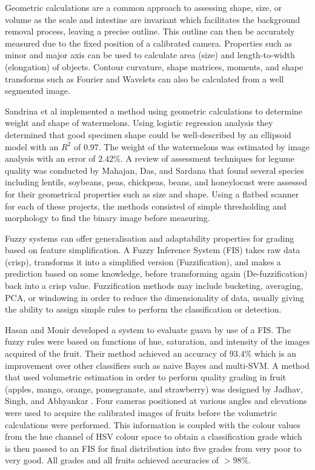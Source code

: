 \documentclass[fleqn,twoside,12pt]{report}
\begin{document}
Geometric calculations are a common approach to assessing shape, size, or volume as the scale and intestine are invariant which facilitates the background removal process, leaving a precise outline. This outline can then be accurately measured due to the fixed position of a calibrated camera. Properties such as minor and major axis can be used to calculate area (size) and length-to-width (elongation) of objects. Contour curvature, shape matrices, moments, and shape transforms such as Fourier and Wavelets can also be calculated from a well segmented image. 

Sandrina et al \cite{sandrina} implemented a method using geometric calculations to determine weight and shape of watermelons. Using logistic regression analysis they determined that good specimen shape could be well-described by an ellipsoid model with an $R^2$ of $0.97$. The weight of the watermelons was estimated by image analysis with an error of $2.42\%$. A review of assessment techniques for legume quality was conducted by Mahajan, Das, and Sardana \cite{mahajan} that found several species including lentils, soybeans, peas, chickpeas, beans, and honeylocust were assessed for their geometrical properties such as size and shape. Using a flatbed scanner for each of these projects, the methods consisted of simple thresholding and morphology to find the binary image before measuring. 


Fuzzy systems can offer generalisation and adaptability properties for grading based on feature simplification. A Fuzzy Inference System (FIS) takes raw data (crisp), transforms it into a simplified version (Fuzzification), and makes a prediction based on some knowledge, before transforming again (De-fuzzification) back into a crisp value. Fuzzification methods may include bucketing, averaging, PCA, or windowing in order to reduce the dimensionality of data, usually giving the ability to assign simple rules to perform the classification or detection.

Hasan and Monir \cite{hasan} developed a system to evaluate guava by use of a FIS. The fuzzy rules were based on functions of hue, saturation, and intensity of the images acquired of the fruit. Their method achieved an accuracy of $93.4\%$ which is an improvement over other classifiers such as naive Bayes and multi-SVM. A method that used volumetric estimation in order to perform quality grading in fruit (apples, mango, orange, pomegranate, and strawberry) was designed by Jadhav, Singh, and Abhyankar \cite{jadhav}. Four cameras positioned at various angles and elevations were used to acquire the calibrated images of fruits before the volumetric calculations were performed. This information is coupled with the colour values from the hue channel of HSV colour space to obtain a classification grade which is then passed to an FIS for final distribution into five grades from very poor to very good. All grades and all fruits achieved accuracies of $>98\%$. 
\end{document}
